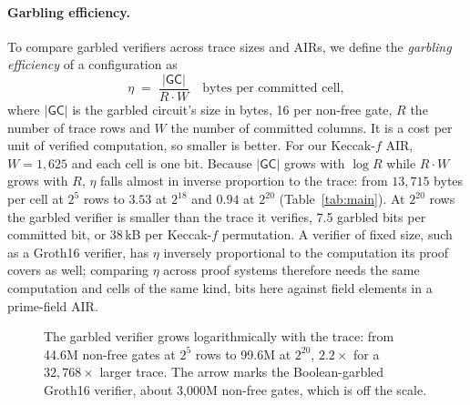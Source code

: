 \documentclass[11pt]{article}
\begin{document}
\paragraph{Garbling efficiency.} To compare garbled verifiers across trace sizes
and AIRs, we define the \emph{garbling efficiency} of a configuration as
\[
  \eta \;=\; \frac{|\mathsf{GC}|}{R\cdot W}\quad\text{bytes per committed cell},
\]
where $|\mathsf{GC}|$ is the garbled circuit's size in bytes, 16 per non-free
gate, $R$ the number of trace rows and $W$ the number of committed columns. It is a
cost per unit of verified computation, so smaller is better. For our Keccak-$f$
AIR, $W=1{,}625$ and each cell is one bit. Because $|\mathsf{GC}|$ grows with
$\log R$ while $R\cdot W$ grows with $R$, $\eta$ falls almost in inverse
proportion to the trace: from $13{,}715$ bytes per cell at $2^5$ rows to $3.53$ at
$2^{18}$ and $0.94$ at $2^{20}$ (Table~\ref{tab:main}). At $2^{20}$ rows the garbled
verifier is smaller than the trace it verifies, 7.5 garbled bits per committed
bit, or 38\,kB per Keccak-$f$ permutation. A verifier of fixed size, such as a
Groth16 verifier, has $\eta$ inversely proportional to the computation its proof
covers as well; comparing $\eta$ across proof systems therefore needs the same
computation and cells of the same kind, bits here against field elements in a
prime-field AIR.

\begin{figure}[t]\centering
{}
\caption{The garbled verifier grows logarithmically with the trace: from 44.6M
non-free gates at $2^5$ rows to 99.6M at $2^{20}$, $2.2\times$ for a
$32{,}768\times$ larger trace. The arrow marks the Boolean-garbled Groth16
verifier, about 3{,}000M non-free gates, which is off the scale.}
\label{fig:scaling}
\end{figure}
\end{document}

